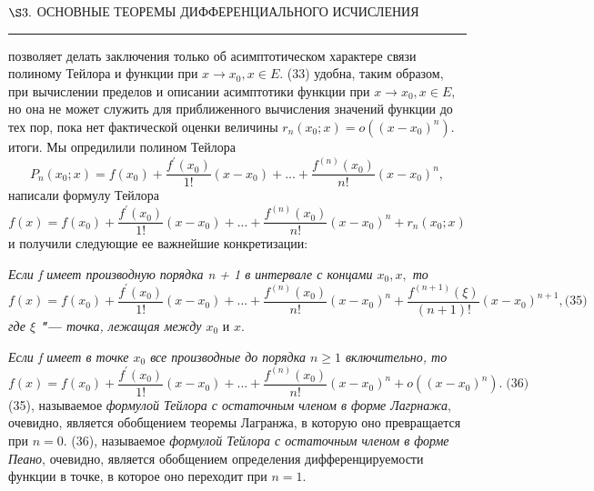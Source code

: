 \documentclass[a5paper, 16pt]{book}
\begin{document}
    \begin{flushleft}
        \begin{spacing}
            $\S3.$ \small{ОСНОВНЫЕ ТЕОРЕМЫ ДИФФЕРЕНЦИАЛЬНОГО ИСЧИСЛЕНИЯ}
            \noindent\rule{\textwidth}{1pt}
		\end{spacing}
    \end{flushleft}
    позволяет делать заключения только об асимптотическом характере связи полиному Тейлора и функции при $x \to x_0,  x \in E.$
     (33) удобна, таким образом, при вычислении пределов и описании асимптотики функции при $x \to x_0, x \in E,$ но она не может служить для приближенного вычисления значений функции до тех пор, пока нет фактической оценки величины $r_n (x_0 ; x) = o((x - x_0)^{n}).$
     итоги. Мы опредилили полином Тейлора
    $$P_n (x_0 ; x) = f (x_0) + \frac{f^{'} (x_0)}{1!} (x - x_0) + . . . + \frac{f^{(n)} (x_0)}{n!} (x - x_0)^{n} ,$$
    написали формулу Тейлора
    $$f (x) = f(x_0) + \frac{f^{'} (x_0)}{1!} (x - x_0) + . . . + \frac{f^{(n)} (x_0)}{n!} (x - x_0)^{n} + r_n (x_0 ; x)$$
    и получили следующие ее важнейшие конкретизации:
    \par\textit{Если f имеет производную порядка n + 1 в интервале с концами $x_0, x,$ то}
    $$f (x) = f (x_0) +  \frac{f^{'} (x_0)}{1!} (x - x_0) + . . . + \frac{f^{(n)} (x_0)}{n!} (x - x_0)^{n} + \frac{f^{(n + 1)} (\xi)}{(n + 1)!} (x - x_0)^{n + 1} , \textrm{(35)}$$
    \textit{где $\xi$ \textbf{"---} точка, лежащая между $x_0 \textit{ и } x.$}
    \par\textit{Если f имеет в точке $x_0$ все производные до порядка $n \geq 1$ включительно, то}
    $$f (x) = f (x_0) +  \frac{f^{'} (x_0)}{1!} (x - x_0) + . . . + \frac{f^{(n)} (x_0)}{n!} (x - x_0)^{n} + o ((x - x_0)^{n}). \; \textrm{(36)}$$
     (35), называемое \textit{формулой Тейлора с остаточным членом в форме Лагрнажа}, очевидно, является обобщением теоремы Лагранжа, в которую оно превращается при $n = 0.$
     (36), называемое \textit{формулой Тейлора с остаточным членом в форме Пеано}, очевидно, является обобщением определения дифференцируемости функции в точке, в которое оно переходит при $n = 1.$

    \newpage
\end{document}
